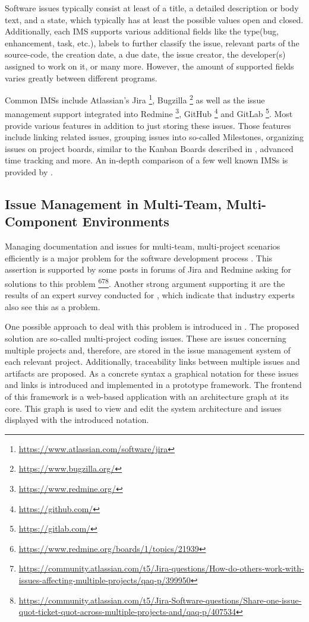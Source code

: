 Software issues typically consist at least of a title, a detailed description or body text, and a state, 
which typically has at least the possible values open and closed.
Additionally, each \gls{IMS} supports various additional fields like the type(bug, enhancement, task, etc.), 
labels to further classify the issue, relevant parts of the source-code, the creation date, a due date, the issue creator, the developer(s) assigned to work on it, or many more.
However, the amount of supported fields varies greatly between different programs.

Common \glspl{IMS} include Atlassian's Jira \footnote{\url{https://www.atlassian.com/software/jira}}, 
Bugzilla \footnote{\url{https://www.bugzilla.org/}} 
as well as the issue management support integrated into Redmine \footnote{\url{https://www.redmine.org/}}, 
GitHub \footnote{\url{https://github.com/}} and 
GitLab \footnote{\url{https://gitlab.com/}}.
Most provide various features in addition to just storing these issues. 
Those features include linking related issues, grouping issues into so-called Milestones, organizing issues on project boards, similar to the Kanban Boards described in \cite{epping2011kanban}, advanced time tracking and more.
An in-depth comparison of a few well known \glspl{IMS} is provided by \cite{janak2009issue}. 

\subsection{Issue Management in Multi-Team, Multi-Component Environments}
\label{ssec:ch2:ss1.2}
Managing documentation and issues for multi-team, multi-project scenarios efficiently is a major problem for the software development process  \cite{mahmood2015identifying}. This assertion is supported by some posts in forums of Jira and Redmine asking for solutions to this problem \footnote{\url{https://www.redmine.org/boards/1/topics/21939}}\footnote{\url{https://community.atlassian.com/t5/Jira-questions/How-do-others-work-with-issues-affecting-multiple-projects/qaq-p/399950}}\footnote{\url{https://community.atlassian.com/t5/Jira-Software-questions/Share-one-issue-quot-ticket-quot-across-multiple-projects-and/qaq-p/407534}}. Another strong argument supporting it are the results of an expert survey conducted for \cite{Speth2019}, which indicate that industry experts also see this as a problem.

One possible approach to deal with this problem is introduced in \cite{Speth2019}.
The proposed solution are so-called multi-project coding issues. These are issues concerning multiple projects and, therefore, are stored in the issue management system of each relevant project. Additionally, traceability links between multiple issues and artifacts are proposed. As a concrete syntax a graphical notation for these issues and links is introduced and implemented in a prototype framework. The frontend of this framework is a web-based application with an architecture graph at its core.
This graph is used to view and edit the system architecture and issues displayed with the introduced notation. 

